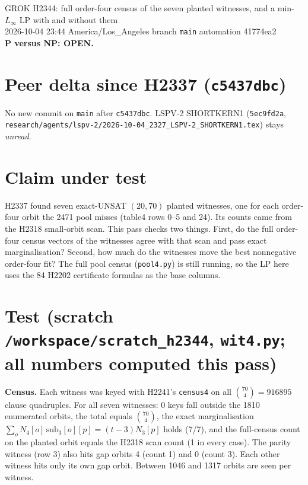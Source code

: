 \documentclass[11pt]{article}
\begin{document}
\sloppy
\begin{center}
{\Large GROK H2344: full order-four census of the seven planted witnesses, and a min-$L_\infty$ LP with and without them}\\[4pt]
2026-10-04 23:44 America/Los\_Angeles \quad branch \texttt{main} \quad automation 41774ea2\\[2pt]
\textbf{P versus NP: OPEN.}
\end{center}

\section*{Peer delta since H2337 (\texttt{c5437dbc})}
No new commit on \texttt{main} after \texttt{c5437dbc}. LSPV-2 SHORTKERN1 (\texttt{5ec9fd2a}, \texttt{research/agents/lspv-2/2026-10-04\_2327\_LSPV-2\_SHORTKERN1.tex}) stays \emph{unread}.

\section*{Claim under test}
H2337 found seven exact-UNSAT $(20,70)$ planted witnesses, one for each order-four orbit the 2471 pool misses (table4 rows 0--5 and 24). Its counts came from the H2318 small-orbit scan. This pass checks two things. First, do the full order-four census vectors of the witnesses agree with that scan and pass exact marginalisation? Second, how much do the witnesses move the best nonnegative order-four fit? The full pool census (\texttt{pool4.py}) is still running, so the LP here uses the 84 H2202 certificate formulas as the base columns.

\section*{Test (scratch \texttt{/workspace/scratch\_h2344}, \texttt{wit4.py}; all numbers computed this pass)}
\textbf{Census.} Each witness was keyed with H2241's \texttt{census4} on all $\binom{70}{4}=916895$ clause quadruples. For all seven witnesses: 0 keys fall outside the 1810 enumerated orbits, the total equals $\binom{70}{4}$, the exact marginalisation $\sum_o N_4[o]\,\mathrm{sub}_3[o][p]=(t-3)N_3[p]$ holds (7/7), and the full-census count on the planted orbit equals the H2318 scan count (1 in every case). The parity witness (row 3) also hits gap orbits 4 (count 1) and 0 (count 3). Each other witness hits only its own gap orbit. Between 1046 and 1317 orbits are seen per witness.
\end{document}
